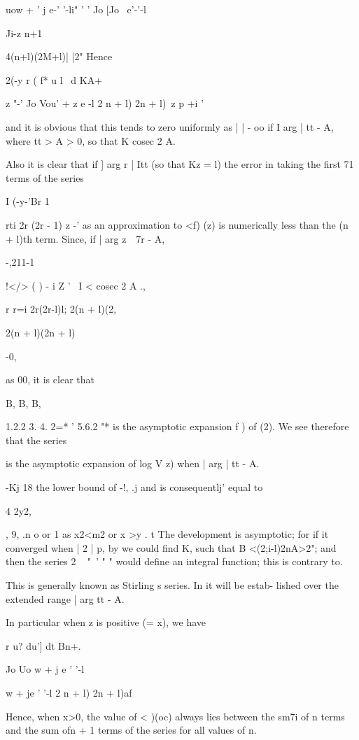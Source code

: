 uow + ' j e-' '-li" ' ' Jo [Jo \ e'-'-l

Ji-z n+1

 4(n+l)(2M+l)| |2" Hence

2(-y r ( f* u l \ d KA+

z "-' Jo Vou' + z e -l 2 n + l) 2n + l)\ z p +i '

and it is obvious that this tends to zero uniformly as | | - oo if I
arg | tt - A, where tt > A > 0, so that K cosec 2 A.

Also it is clear that if ] arg r | Itt (so that Kz = l) the error in
taking the first 71 terms of the series

I (-y-'Br 1

rti 2r (2r - 1) z -' as an approximation to <f) (z) is numerically
less than the (n + l)th term. Since, if | arg z\ \ 7r - A,

-,211-1

!</> ( ) - i Z ' \ I < cosec 2 A .,

r r=i 2r(2r-l)l; 2(n + l)(2,

2(n + l)(2n + l)

-0,

as 00, it is clear that

B, B, B,

1.2.2 3. 4. 2=* ' 5.6.2 "* is the asymptotic expansion f ) of
(2). We see therefore that the series

is the asymptotic expansion of log V z) when | arg | tt - A.

-Kj 18 the lower bound of -!, .j and is consequentlj' equal to

4 2y2,

, 9, .n o or 1 as x2<m2 or x >y . t The development is asymptotic;
for if it converged when | 2 | p, by we could find K, such that
B <(2;i-l)2nA>2"; and then the series 2 ~ "~' " " would define an
integral function; this is contrary to.

%
%

This is generally known as Stirling s series. In it will be
estab- lished over the extended range | arg tt - A.

In particular when z is positive (= x), we have

r u? du'] dt Bn+.

Jo Uo w + j e ' '-l

w + je ' '-l 2 n + l) 2n + l)af

Hence, when x>0, the value of < )(oc) always lies between the sm7i of
n terms and the sum ofn + 1 terms of the series for all values of n.


